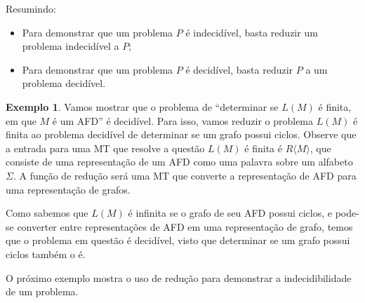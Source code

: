 \documentclass[a4paper]{article}
\theoremstyle{definition}
\newtheorem{Example}{Exemplo}
\begin{document}
  Resumindo:

  \begin{itemize}
     \item Para demonstrar que um problema $P$ é indecidível, basta reduzir um
       problema indecidível a $P$;
     \item Para demonstrar que um problema $P$ é decidível, basta reduzir $P$ a
       um problema decidível.
  \end{itemize}

  \begin{Example}
    Vamos mostrar que o problema de ``determinar se $L(M)$ é finita, em que $M$
    é um AFD'' é decidível. Para isso, vamos reduzir o problema $L(M)$ é finita
    ao problema decidível de determinar se um grafo possui ciclos. Observe que a
    entrada para uma MT que resolve a questão $L(M)$ é finita é $R\langle M
    \rangle$, que consiste de uma representação de um AFD como uma palavra sobre
    um alfabeto $\Sigma$. A função de redução será uma MT que converte a
    representação de AFD para uma representação de grafos.

    Como sabemos que $L(M)$ é infinita se o grafo de seu AFD possui ciclos, e
    pode-se converter entre representações de AFD em uma representação de grafo,
    temos que o problema em questão é decidível, visto que determinar se um
    grafo possui ciclos também o é.
  \end{Example}

  O próximo exemplo mostra o uso de redução para demonstrar a indecidibilidade
  de um problema.
\end{document}
